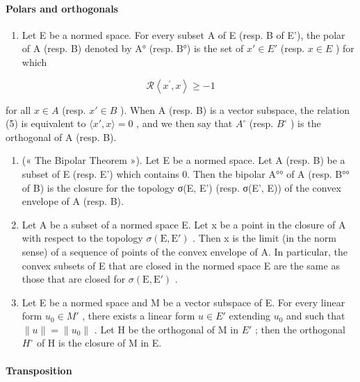\paragraph{Polars and orthogonals}

\begin{enumerate}
\def\labelenumi{\arabic{enumi})}
\setcounter{enumi}{4}
\tightlist
\item
  Let E be a normed space. For every subset A of E (resp. B of E'), the polar of A (resp. B) denoted by A° (resp. B°) is the set of \(x' \in E'\) (resp. \(x \in E\) ) for which
\end{enumerate}

\[
\mathcal {R} \left<   x ^ {\prime}, x \right> \geqslant - 1\tag{5}
\]

for all \(x \in A\) (resp. \(x' \in B\) ). When A (resp. B) is a vector subspace, the relation (5) is equivalent to \(\langle x', x \rangle = 0\) , and we then say that \(A^{\circ}\) (resp. \(B^{\circ}\) ) is the orthogonal of A (resp. B).

\begin{enumerate}
\def\labelenumi{\arabic{enumi})}
\setcounter{enumi}{5}
\item
  (« The Bipolar Theorem »). Let E be a normed space. Let A (resp. B) be a subset of E (resp. E') which contains 0. Then the bipolar A°° of A (resp. B°° of B) is the closure for the topology σ(E, E') (resp. σ(E', E)) of the convex envelope of A (resp. B).
\item
  Let A be a subset of a normed space E. Let x be a point in the closure of A with respect to the topology \(\sigma(\mathrm{E}, \mathrm{E}')\) . Then x is the limit (in the norm sense) of a sequence of points of the convex envelope of A. In particular, the convex subsets of E that are closed in the normed space E are the same as those that are closed for \(\sigma(\mathrm{E}, \mathrm{E}')\) .
\item
   Let E be a normed space and M be a vector subspace of E. For every linear form \(u_{0} \in M'\) , there exists a linear form \(u \in E'\) extending \(u_{0}\) and such that \(\|u\| = \|u_{0}\|\) . Let H be the orthogonal of M in \(E'\) ; then the orthogonal \(H^{\circ}\) of H is the closure of M in E.
\end{enumerate}

\paragraph{Transposition}

